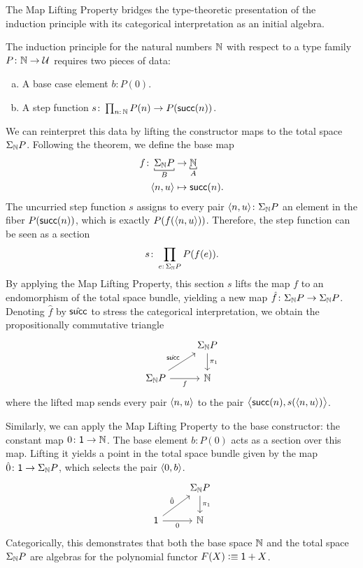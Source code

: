 \begin{xmpl}
    The Map Lifting Property bridges the type-theoretic presentation of the induction principle with its categorical interpretation as an initial algebra.
    
    The induction principle for the natural numbers $\mathbb{N}$ with respect to a type family $P\colon\N\to\univ$ requires two pieces of data:
    \begin{enumerate}[a),font=\upshape]
        \item A base case element $b\colon P(0)$.
        \item A step function $s\colon\prod_{n\colon\N} P(n)\to P(\fun{succ}(n))$.
    \end{enumerate}
    We can reinterpret this data by lifting the constructor maps to the total space $\Sigma_{\mathbb{N}} P$. Following the theorem, we define the base map
    \begin{align*}
        f\colon\explain[B]{\Sigma_\N P}&\to\explain[A]\N\\
        \dep{n,u}&\mapsto\fun{succ}(n). 
    \end{align*}
    The uncurried step function $s$ assigns to every pair $\dep{n,u}\colon\Sigma_\N P$ an element in the fiber $P(\mathsf{succ}(n))$, which is exactly $P(f(\langle n,u\rangle))$. Therefore, the step function can be seen as a section
    \[
        s\colon\prod_{e\colon\Sigma_\N P}P(f(e)).
    \]
    By applying the Map Lifting Property, this section $s$ lifts the map $f$ to an endomorphism of the total space bundle, yielding a new map $\hat{f}\colon\Sigma_\N P\to\Sigma_\N P$. Denoting $\hat{f}$ by $\hat{\mathsf{succ}}$ to stress the categorical interpretation, we obtain the propositionally commutative triangle
    \[
        \begin{tikzcd}
                &\Sigma_\N P
                    \arrow[d,"\pi_1"]\\
            \Sigma_\N P
                    \arrow[ru,"\hat{\fun{succ}}"]
                    \arrow[r,"f"']
                &\N
        \end{tikzcd}
    \]
    where the lifted map sends every pair $\langle n,u\rangle$ to the pair $\bigl\langle\mathsf{succ}(n),s(\langle n,u\rangle)\bigr\rangle$. 
    
    Similarly, we can apply the Map Lifting Property to the base constructor: the constant map $0\colon\fun1\to\N$. The base element $b\colon P(0)$ acts as a section over this map. Lifting it yields a point in the total space bundle given by the map $\hat{0}\colon\fun1\to\Sigma_\N P$, which selects the pair $\langle0,b\rangle$.
    \[
        \begin{tikzcd}
                &\Sigma_\N P
                    \arrow[d,"\pi_1"]\\
            \fun1
                    \arrow[ru,"\hat{0}"]
                    \arrow[r,"0"']
                &\N
        \end{tikzcd}
    \]
    Categorically, this demonstrates that both the base space $\mathbb{N}$ and the total space $\Sigma_{\mathbb{N}} P$ are algebras for the polynomial functor $F(X)\mathrel{\vcentcolon}\equiv\mathsf{1}+X$.
    

\end{xmpl}
